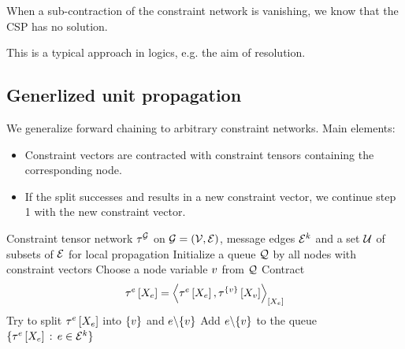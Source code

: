 When a sub-contraction of the constraint network is vanishing, we know that the CSP has no solution.

This is a typical approach in logics, e.g. the aim of resolution.

\subsection{Generlized unit propagation}


We generalize forward chaining to arbitrary constraint networks.
Main elements:
\begin{itemize}
    \item Constraint vectors are contracted with constraint tensors containing the corresponding node.
    \item If the split successes and results in a new constraint vector, we continue step 1 with the new constraint vector.
\end{itemize}

\begin{algorithm}[hbt!]
    \caption{Generalized Forward Chaining}\label{alg:genForwardChaining}
    \begin{algorithmic}
        \Require Constraint tensor network $\tau^{\mathcal{G}}$ on $\mathcal{G}=(\mathcal{V},\mathcal{E})$, message edges $\mathcal{E}^{k}$ and a set $\mathcal{U}$ of subsets of $\mathcal{E}$ for local propagation
        \Ensure
        \iosepline
        \State
        \State Initialize a queue $\mathcal{Q}$ by all nodes with constraint vectors
            \State Choose a node variable $v$ from $\mathcal{Q}$
                \State Contract
                \begin{align*}
                    \tau^{e}\left[X_{e}\right]
                    = \left\langle \tau^{e}\left[X_{e}\right],\tau^{\{v\}}\left[X_{v}\right]\right\rangle_{\left[ X_{e} \right]}
                \end{align*}
                \State Try to split $\tau^{e}\left[X_{e}\right]$ into $\{v\}$ and $e\backslash\{v\}$
                    \State Add $e\backslash\{v\}$ to the queue
                \EndIf
            \EndFor
        \EndWhile
        \State \Return $\{\tau^{e}\left[X_{e}\right]\,:\,e\in\mathcal{E}^{k}\}$
    \end{algorithmic}
\end{algorithm}

